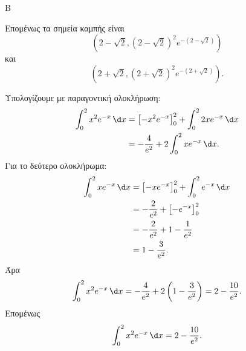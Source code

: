 \begin{thema}{Β}
\begin{erwthma}
Επομένως τα σημεία καμπής είναι
\[
\left(2-\sqrt2,(2-\sqrt2)^2e^{-(2-\sqrt2)}\right)
\]
και
\[
\left(2+\sqrt2,(2+\sqrt2)^2e^{-(2+\sqrt2)}\right).
\]

\item Υπολογίζουμε με παραγοντική ολοκλήρωση:
\begin{align*}
\dint_0^2 x^2e^{-x}\,\d x
&=\left[-x^2e^{-x}\right]_0^2+\dint_0^2 2xe^{-x}\,\d x\\
&=-\frac{4}{e^2}+2\dint_0^2 xe^{-x}\,\d x.
\end{align*}
Για το δεύτερο ολοκλήρωμα:
\begin{align*}
\dint_0^2 xe^{-x}\,\d x
&=\left[-xe^{-x}\right]_0^2+\dint_0^2 e^{-x}\,\d x\\
&=-\frac{2}{e^2}+\left[-e^{-x}\right]_0^2\\
&=-\frac{2}{e^2}+1-\frac{1}{e^2}\\
&=1-\frac{3}{e^2}.
\end{align*}
Άρα
\[
\dint_0^2 x^2e^{-x}\,\d x
=-\frac{4}{e^2}+2\left(1-\frac{3}{e^2}\right)
=2-\frac{10}{e^2}.
\]
Επομένως
\[
{\dint_0^2 x^2e^{-x}\,\d x=2-\frac{10}{e^2}}.
\]
\end{erwthma}
\end{thema}

